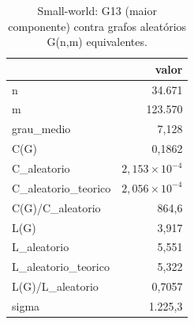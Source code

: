 \begin{table}[htbp]
\centering
\small
\caption{Small-world: G13 (maior componente) contra grafos aleatórios G(n,m) equivalentes.}
\label{tab:05_small_world}
\begin{tabular}{lr}
\toprule
 & valor \\
\midrule
n & 34.671 \\
m & 123.570 \\
grau\_medio & 7,128 \\
C(G) & 0,1862 \\
C\_aleatorio & $2,153 \times 10^{-4}$ \\
C\_aleatorio\_teorico & $2,056 \times 10^{-4}$ \\
C(G)/C\_aleatorio & 864,6 \\
L(G) & 3,917 \\
L\_aleatorio & 5,551 \\
L\_aleatorio\_teorico & 5,322 \\
L(G)/L\_aleatorio & 0,7057 \\
sigma & 1.225,3 \\
\bottomrule
\end{tabular}
\end{table}
